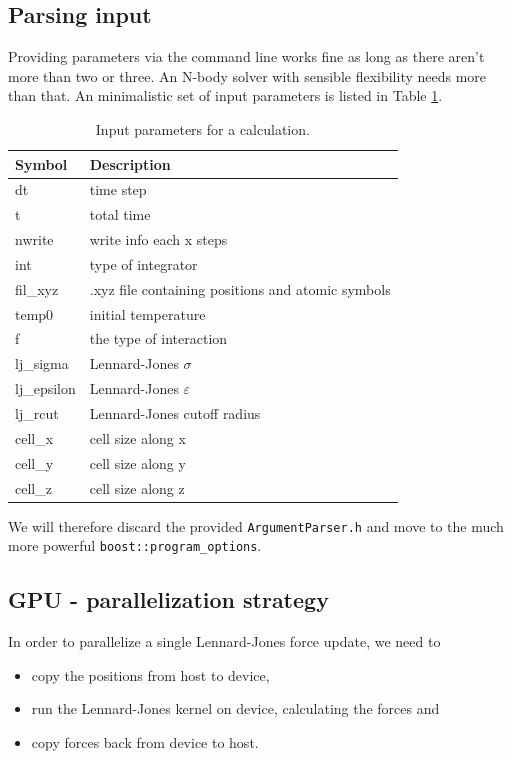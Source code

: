 \documentclass{scrartcl}
\begin{document}
\subsection{Parsing input}

Providing parameters via the command line works fine as long as there aren't
more than two or three.
An N-body solver with sensible flexibility needs more than that.
An minimalistic set of input parameters is listed in Table \ref{tab:input}.

\begin{table}
    \centering
\begin{tabular}[h!]{l|l}
    Symbol & Description \\\hline
    dt & time step \\
    t & total time \\
    nwrite & write info each x steps\\
    int & type of integrator\\
    fil\_xyz & .xyz file containing positions and atomic symbols\\
    temp0 & initial temperature\\ 
    f & the type of interaction\\
    lj\_sigma & Lennard-Jones $\sigma$ \\
    lj\_epsilon & Lennard-Jones $\varepsilon$\\
    lj\_rcut & Lennard-Jones cutoff radius\\
    cell\_x & cell size along x\\
    cell\_y & cell size along y\\
    cell\_z & cell size along z
\end{tabular}
    \caption{Input parameters for a calculation.}
    \label{tab:input}
\end{table}

We will therefore discard the provided \verb|ArgumentParser.h| and move
to the much more powerful \verb|boost::program_options|.


\subsection{GPU - parallelization strategy}

In order to parallelize a single Lennard-Jones force update,
we need to

\begin{itemize}
    \item copy the positions from host to device,
    \item run the Lennard-Jones kernel on device, calculating the forces and
    \item copy forces back from device to host.
\end{itemize}
\end{document}

